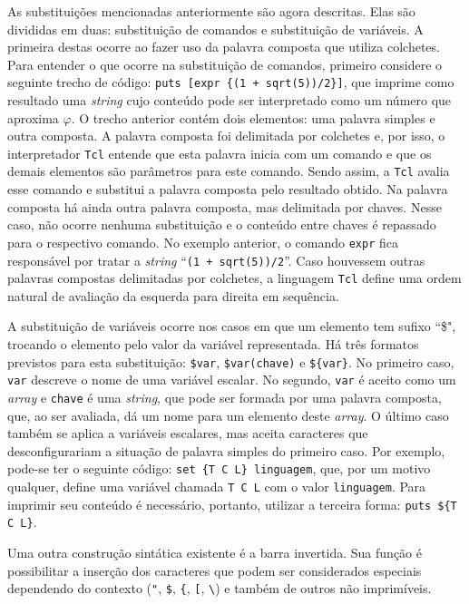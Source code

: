 As substituições mencionadas anteriormente são agora descritas. Elas
são divididas em duas: substituição de comandos e substituição de
variáveis. A primeira destas ocorre ao fazer uso da palavra composta
que utiliza colchetes. Para entender o que ocorre na substituição de
comandos, primeiro considere o seguinte trecho de código:
\verb!puts [expr {(1 + sqrt(5))/2}]!, que imprime como resultado
uma \textit{string} cujo conteúdo pode ser interpretado como um número
que aproxima $\varphi$.
O trecho anterior contém dois
elementos: uma palavra simples e outra composta. A palavra composta foi
delimitada por colchetes e, por isso, o interpretador \texttt{Tcl}
entende que esta palavra inicia com um comando e que os demais
elementos são parâmetros para este comando. Sendo assim, a
\texttt{Tcl} avalia esse comando e substitui a palavra composta pelo
resultado obtido. Na palavra composta há ainda outra palavra composta,
mas delimitada por chaves. Nesse caso, não ocorre nenhuma substituição
e o conteúdo entre chaves é repassado para o respectivo comando. No
exemplo anterior, o comando \verb!expr! fica responsável por tratar a
\textit{string} ``\verb!(1 + sqrt(5))/2!''. Caso houvessem outras
palavras compostas delimitadas por colchetes, %
 a linguagem \texttt{Tcl}
define uma ordem natural de avaliação da esquerda para direita em
sequência.

A substituição de variáveis ocorre nos
casos em que um elemento tem sufixo ``\$", trocando o elemento pelo
valor da variável representada. Há três formatos previstos para esta
substituição: \verb!$var!, \verb!$var(chave)! e
\verb!${var}!. No primeiro caso, \verb!var! descreve o nome de uma
variável escalar. No segundo, \verb!var! é aceito como um \textit{array}
e \verb!chave! é uma \textit{string}, que pode ser formada
por uma palavra composta, que, ao ser avaliada, dá um nome para um
elemento deste \textit{array}. O último caso também se aplica a
variáveis escalares, mas aceita caracteres que desconfigurariam a
situação de palavra simples do primeiro caso. Por exemplo, pode-se
ter o seguinte código: \verb!set {T C L} linguagem!, que, por um
motivo qualquer, define uma variável chamada \verb!T C L! com o valor
\verb!linguagem!. Para imprimir seu conteúdo é necessário, portanto,
utilizar a terceira forma: \verb!puts ${T C L}!.

Uma outra construção sintática existente é a barra invertida. Sua
função é possibilitar a inserção dos caracteres que podem ser
considerados especiais dependendo do contexto (\verb!"!, \verb!$!,
\verb!{!, \verb![!, \verb!\!) e também de outros não imprimíveis.

